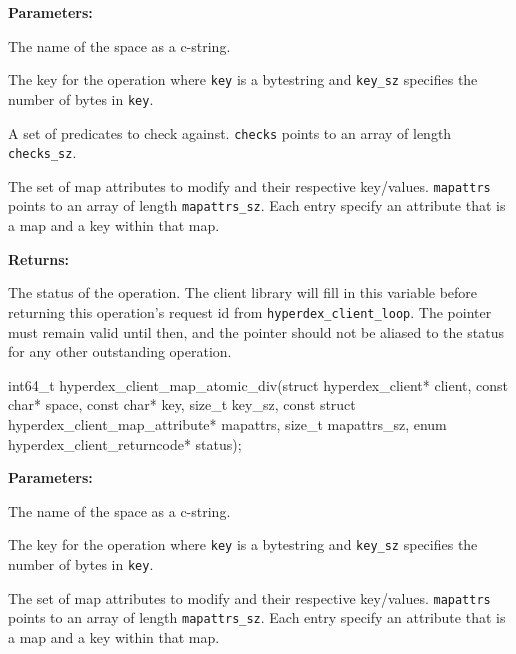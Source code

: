 \noindent\textbf{Parameters:}
\begin{description}[labelindent=\widthof{{\texttt{mapattrs}, \texttt{mapattrs\_sz}}},leftmargin=*,noitemsep,nolistsep,align=right]
\item[\texttt{space}] The name of the space as a c-string.
\item[\texttt{key}, \texttt{key\_sz}] The key for the operation where \texttt{key} is a bytestring and \texttt{key\_sz} specifies the number of bytes in \texttt{key}.
\item[\texttt{checks}, \texttt{checks\_sz}] A set of predicates to check against.  \texttt{checks} points to an array of length \texttt{checks\_sz}.
\item[\texttt{mapattrs}, \texttt{mapattrs\_sz}] The set of map attributes to modify and their respective key/values.  \texttt{mapattrs} points to an array of length \texttt{mapattrs\_sz}.  Each entry specify an attribute that is a map and a key within that map.
\end{description}

\noindent\textbf{Returns:}
\begin{description}[labelindent=\widthof{{\texttt{status}}},leftmargin=*,noitemsep,nolistsep,align=right]
\item[\texttt{status}] The status of the operation.  The client library will fill in this variable before returning this operation's request id from \texttt{hyperdex\_client\_loop}.  The pointer must remain valid until then, and the pointer should not be aliased to the status for any other outstanding operation.
\end{description}

\funcsep
{}
\begin{ccode}
int64_t hyperdex_client_map_atomic_div(struct hyperdex_client* client,
                const char* space,
                const char* key, size_t key_sz,
                const struct hyperdex_client_map_attribute* mapattrs, size_t mapattrs_sz,
                enum hyperdex_client_returncode* status);
\end{ccode}
\funcdesc 

\noindent\textbf{Parameters:}
\begin{description}[labelindent=\widthof{{\texttt{mapattrs}, \texttt{mapattrs\_sz}}},leftmargin=*,noitemsep,nolistsep,align=right]
\item[\texttt{space}] The name of the space as a c-string.
\item[\texttt{key}, \texttt{key\_sz}] The key for the operation where \texttt{key} is a bytestring and \texttt{key\_sz} specifies the number of bytes in \texttt{key}.
\item[\texttt{mapattrs}, \texttt{mapattrs\_sz}] The set of map attributes to modify and their respective key/values.  \texttt{mapattrs} points to an array of length \texttt{mapattrs\_sz}.  Each entry specify an attribute that is a map and a key within that map.
\end{description}

